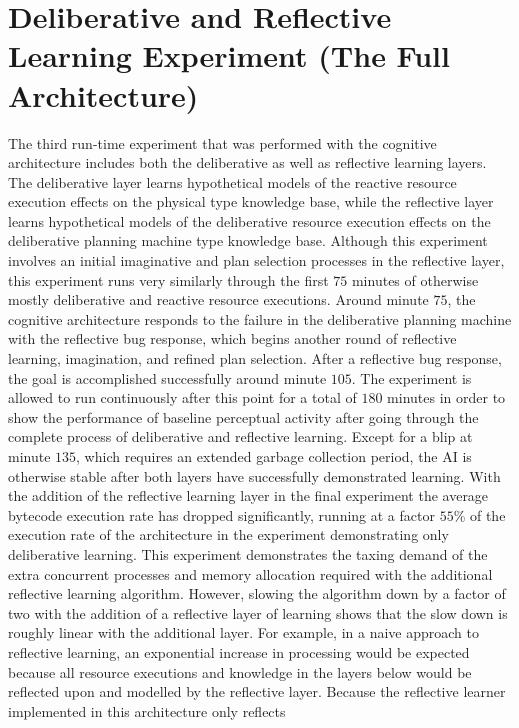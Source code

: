 \section{Deliberative and Reflective Learning Experiment (The Full Architecture)}

The third run-time experiment that was performed with the cognitive
architecture includes both the deliberative as well as reflective
learning layers.  The deliberative layer learns hypothetical models of
the reactive resource execution effects on the physical type knowledge
base, while the reflective layer learns hypothetical models of the
deliberative resource execution effects on the deliberative planning
machine type knowledge base.  Although this experiment involves an
initial imaginative and plan selection processes in the reflective
layer, this experiment runs very similarly through the first $75$
minutes of otherwise mostly deliberative and reactive resource
executions.  Around minute $75$, the cognitive architecture responds
to the failure in the deliberative planning machine with the
reflective bug response, which begins another round of reflective
learning, imagination, and refined plan selection.  After a reflective
bug response, the goal is accomplished successfully around minute
$105$.  The experiment is allowed to run continuously after this point
for a total of $180$ minutes in order to show the performance of
baseline perceptual activity after going through the complete process
of deliberative and reflective learning.  Except for a blip at minute
$135$, which requires an extended garbage collection period, the AI is
otherwise stable after both layers have successfully demonstrated
learning.  With the addition of the reflective learning layer in the
final experiment the average bytecode execution rate has dropped
significantly, running at a factor $55$\% of the execution rate of the
architecture in the experiment demonstrating only deliberative
learning.  This experiment demonstrates the taxing demand of the extra
concurrent processes and memory allocation required with the
additional reflective learning algorithm.  However, slowing the
algorithm down by a factor of two with the addition of a reflective
layer of learning shows that the slow down is roughly linear with the
additional layer.  For example, in a naive approach to reflective
learning, an exponential increase in processing would be expected
because all resource executions and knowledge in the layers below
would be reflected upon and modelled by the reflective layer.  Because
the reflective learner implemented in this architecture only reflects
